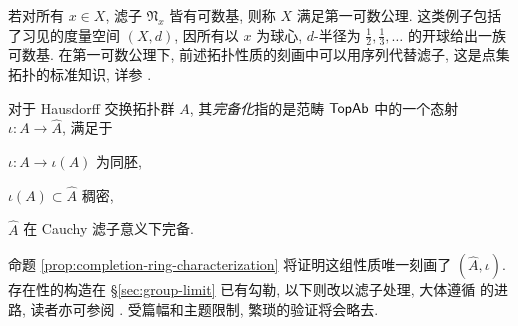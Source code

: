 若对所有 $x \in X$, 滤子 $\mathfrak{N}_x$ 皆有可数基, 则称 $X$ 满足第一可数公理. 这类例子包括了习见的度量空间 $(X, d)$, 因所有以 $x$ 为球心, $d$-半径为 $\frac{1}{2}, \frac{1}{3}, \ldots$ 的开球给出一族可数基. 在第一可数公理下, 前述拓扑性质的刻画中可以用序列代替滤子, 这是点集拓扑的标准知识, 详参 \cite[\S 5.1]{Xiong}.

对于 Hausdorff 交换拓扑群 $A$, 其\emph{完备化}指的是范畴 $\mathsf{TopAb}$ 中的一个态射 $\iota: A \to \hat{A}$, 满足于 
\begin{compactenum}[(\bfseries {CO}.1)]
	\item $\iota: A \to \iota(A)$ 为同胚,
	\item $\iota(A) \subset \hat{A}$ 稠密,
	\item $\hat{A}$ 在 Cauchy 滤子意义下完备.
\end{compactenum}
命题 \ref{prop:completion-ring-characterization} 将证明这组性质唯一刻画了 $(\hat{A}, \iota)$. 存在性的构造在 \S\ref{sec:group-limit} 已有勾勒, 以下则改以滤子处理, 大体遵循 \cite[\S 8]{Str06} 的进路, 读者亦可参阅 \cite[Chapitre III]{Bou-Top1}. 受篇幅和主题限制, 繁琐的验证将会略去.

